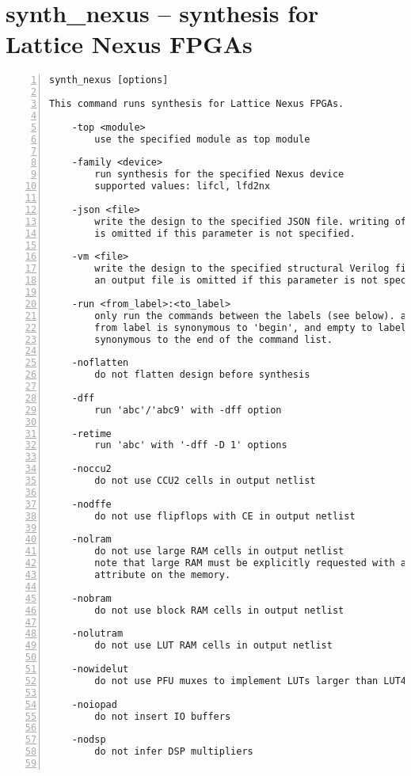 \section{synth\_nexus -- synthesis for Lattice Nexus FPGAs}
\label{cmd:synth_nexus}
\begin{lstlisting}[numbers=left,frame=single]
    synth_nexus [options]

This command runs synthesis for Lattice Nexus FPGAs.

    -top <module>
        use the specified module as top module

    -family <device>
        run synthesis for the specified Nexus device
        supported values: lifcl, lfd2nx

    -json <file>
        write the design to the specified JSON file. writing of an output file
        is omitted if this parameter is not specified.

    -vm <file>
        write the design to the specified structural Verilog file. writing of
        an output file is omitted if this parameter is not specified.

    -run <from_label>:<to_label>
        only run the commands between the labels (see below). an empty
        from label is synonymous to 'begin', and empty to label is
        synonymous to the end of the command list.

    -noflatten
        do not flatten design before synthesis

    -dff
        run 'abc'/'abc9' with -dff option

    -retime
        run 'abc' with '-dff -D 1' options

    -noccu2
        do not use CCU2 cells in output netlist

    -nodffe
        do not use flipflops with CE in output netlist

    -nolram
        do not use large RAM cells in output netlist
        note that large RAM must be explicitly requested with a (* lram *)
        attribute on the memory.

    -nobram
        do not use block RAM cells in output netlist

    -nolutram
        do not use LUT RAM cells in output netlist

    -nowidelut
        do not use PFU muxes to implement LUTs larger than LUT4s

    -noiopad
        do not insert IO buffers

    -nodsp
        do not infer DSP multipliers


\end{lstlisting}
